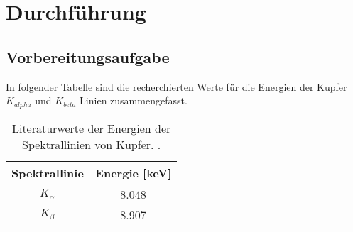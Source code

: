 \section{Durchführung}
\label{sec:Durchführung}
\subsection{Vorbereitungsaufgabe}
\label{sec:vorbereitung}
In folgender Tabelle sind die recherchierten Werte für die Energien der Kupfer $K_{alpha}$ und $K_{beta}$ 
Linien zusammengefasst.
\begin{table}[H]
    \centering
    \caption{Literaturwerte der Energien der Spektrallinien von Kupfer. \cite{AP03}.}
    \label{tab:brechungsind}
    \begin{tabular}{S S}
      \toprule
      {Spektrallinie} & {Energie [\si{\kilo\electronvolt}]} \\
      \midrule
    {$K_{\alpha}$} & 8.048 \\
    {$K_{\beta} $} & 8.907 \\
      \bottomrule
    \end{tabular}
  \end{table}
\noindent
